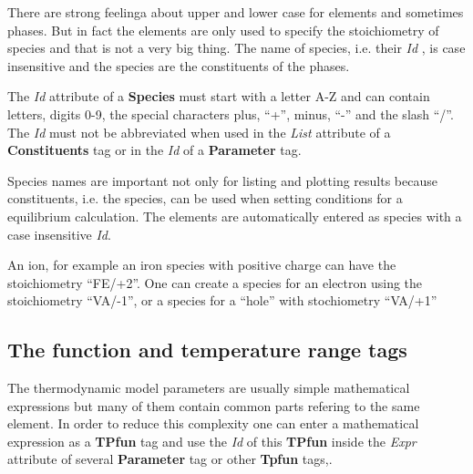 \documentclass{article}
\begin{document}
There are strong feelinga about upper and lower case for elements and
sometimes phases.  But in fact the elements are only used to specify
the stoichiometry of species and that is not a very big thing.  The name
of species, i.e. their {\em Id} , is case insensitive and the species
are the constituents of the phases.

The {\em Id} attribute of a {\bf Species} must start with a letter A-Z
and can contain letters, digits 0-9, the special characters plus,
``+'', minus, ``-'' and the slash ``/''.  The {\em Id} must not be
abbreviated when used in the {\em List} attribute of a {\bf
  Constituents} tag or in the {\em Id} of a {\bf Parameter} tag.

Species names are important not only for listing and plotting results
because constituents, i.e. the species, can be used when setting
conditions for a equilibrium calculation.  The elements are
automatically entered as species with a case insensitive {\em Id}.

An ion, for example an iron species with positive charge can have the
stoichiometry ``FE/+2''.  One can create a species for an electron
using the stoichiometry ``VA/-1'', or a species for a ``hole'' with
stochiometry ``VA/+1''

\newpage

\subsection{The function and temperature range tags}\label{sec:tpfun}

The thermodynamic model parameters are usually simple mathematical
expressions but many of them contain common parts refering to the same
element.  In order to reduce this complexity one can enter a
mathematical expression as a {\bf TPfun} tag and use the {\em Id} of
this {\bf TPfun} inside the {\em Expr} attribute of several {\bf
  Parameter} tag or other {\bf Tpfun} tags,.
\end{document}
